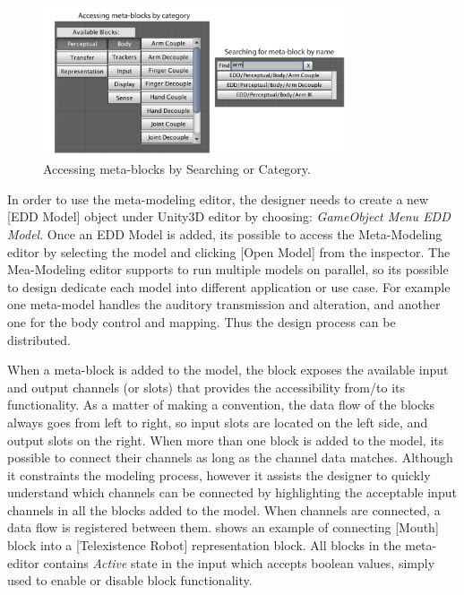 \begin{figure}[htpb]
\centering
\captionsetup{justification=centering} 
\includegraphics[width=0.8\textwidth]{figures/system/Blocks/Nodes.pdf}
\caption{Accessing meta-blocks by Searching or Category.}
  \label{fig:system-blocks-nodes}
\end{figure}

In order to use the meta-modeling editor, the designer needs to create a new [EDD Model] object under Unity3D editor by choosing: \textit{GameObject Menu \textrightarrow EDD Model}. Once an EDD Model is added, its possible to access the Meta-Modeling editor by selecting the model and clicking [Open Model] from the inspector. The Mea-Modeling editor supports to run multiple models on parallel, so its possible to design dedicate each model into different application or use case. For example one meta-model handles the auditory transmission and alteration, and another one for the body control and mapping. Thus the design process can be distributed.

When a meta-block is added to the model, the block exposes the available input and output channels (or slots) that provides the accessibility from/to its functionality. As a matter of making a convention, the data flow of the blocks always goes from left to right, so input slots are located on the left side, and output slots on the right. When more than one block is added to the model, its possible to connect their channels as long as the channel data matches. Although it constraints the modeling process, however it assists the designer to quickly understand which channels can be connected by highlighting the acceptable input channels in all the blocks added to the model. When channels are connected, a data flow is registered between them.  shows an example of connecting [Mouth] block into a [Telexistence Robot] representation block. All blocks in the meta-editor contains \textit{Active} state in the input which accepts boolean values, simply used to enable or disable block functionality.

